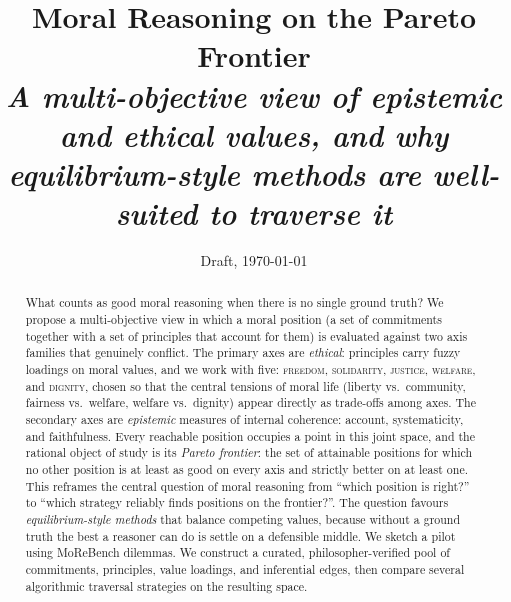 \documentclass[10pt]{article}
\title{\bfseries Moral Reasoning on the Pareto Frontier\\
\normalsize\itshape A multi-objective view of epistemic and ethical values, and why equilibrium-style methods are well-suited to traverse it}
\author{}
\date{\small Draft, \today}
\begin{document}
\maketitle

\begin{abstract}\small
\noindent
What counts as good moral reasoning when there is no single ground truth?
We propose a multi-objective view in which a moral position (a set of
commitments together with a set of principles that account for them) is
evaluated against two axis families that genuinely conflict. The primary axes
are \emph{ethical}: principles carry fuzzy loadings on moral values, and we
work with five: \textsc{freedom}, \textsc{solidarity}, \textsc{justice},
\textsc{welfare}, and \textsc{dignity}, chosen so that the central tensions of
moral life (liberty vs.\ community, fairness vs.\ welfare,
welfare vs.\ dignity) appear directly as trade-offs among axes. The secondary
axes are \emph{epistemic} measures of internal coherence: account,
systematicity, and faithfulness. Every reachable position occupies a point in
this joint space, and the rational object of study is its \emph{Pareto
frontier}: the set of attainable positions for which no other position is at
least as good on every axis and strictly better on at least one. This reframes
the central question of moral reasoning from ``which position is right?'' to
``which strategy reliably finds positions on the frontier?''. The question
favours \emph{equilibrium-style methods} that balance competing values,
because without a ground truth the best a reasoner can do is settle on a
defensible middle. We sketch a pilot using MoReBench dilemmas. We construct
a curated, philosopher-verified pool of commitments, principles, value
loadings, and inferential edges, then compare several algorithmic traversal
strategies on the resulting space.
\end{abstract}
\end{document}
